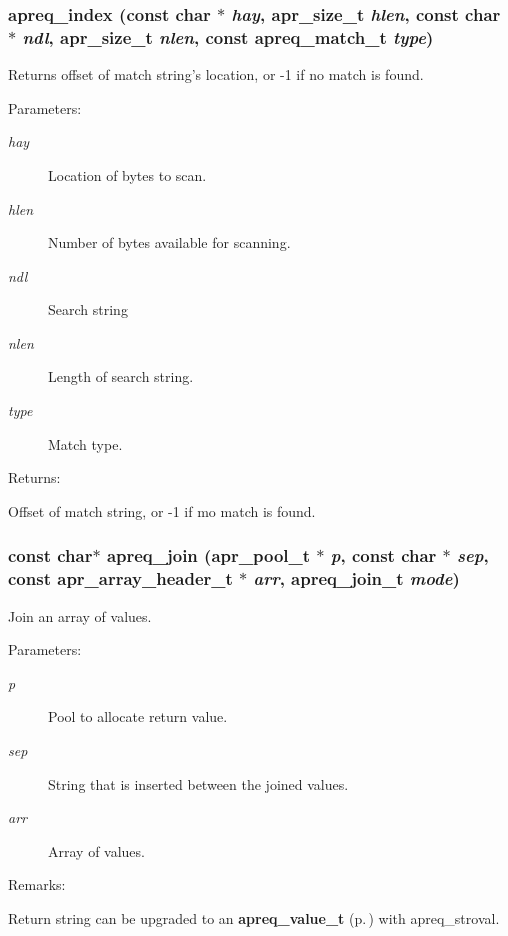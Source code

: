 \subsubsection{ apreq\_\-index (const char $\ast$ {\em hay}, {\bf apr\_\-size\_\-t} {\em hlen}, const char $\ast$ {\em ndl}, {\bf apr\_\-size\_\-t} {\em nlen}, const {\bf apreq\_\-match\_\-t} {\em type})}\label{group__Utils_a9}


Returns offset of match string's location, or -1 if no match is found. \begin{Desc}
\item[Parameters: ]\par
\begin{description}
\item[{\em 
hay}]Location of bytes to scan. \item[{\em 
hlen}]Number of bytes available for scanning. \item[{\em 
ndl}]Search string \item[{\em 
nlen}]Length of search string. \item[{\em 
type}]Match type. \end{description}
\end{Desc}
\begin{Desc}
\item[Returns: ]\par
Offset of match string, or -1 if mo match is found. \end{Desc}
\subsubsection{\setlength{\rightskip}{0pt plus 5cm}const char$\ast$ apreq\_\-join ({\bf apr\_\-pool\_\-t} $\ast$ {\em p}, const char $\ast$ {\em sep}, const {\bf apr\_\-array\_\-header\_\-t} $\ast$ {\em arr}, {\bf apreq\_\-join\_\-t} {\em mode})}\label{group__Utils_a7}


Join an array of values. \begin{Desc}
\item[Parameters: ]\par
\begin{description}
\item[{\em 
p}]Pool to allocate return value. \item[{\em 
sep}]String that is inserted between the joined values. \item[{\em 
arr}]Array of values. \end{description}
\end{Desc}
\begin{Desc}
\item[Remarks: ]\par
Return string can be upgraded to an {\bf apreq\_\-value\_\-t} {\rm (p.\,\pageref{structapreq__value__t})}  with apreq\_\-stroval. \end{Desc}
